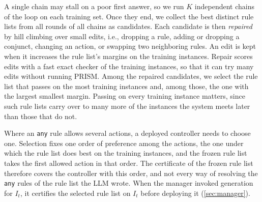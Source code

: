 A single chain may stall on a poor first answer, so we run $K$ independent chains of the loop on each training set.
Once they end, we collect the best distinct rule lists from all rounds of all chains as candidates.
Each candidate is then \textit{repaired} by hill climbing over small edits, i.e., dropping a rule, adding or dropping a conjunct, changing an action, or swapping two neighboring rules.
An edit is kept when it increases the rule list's margins on the training instances.
Repair scores edits with a fast exact checker of the training instances, so that it can try many edits without running PRISM.
Among the repaired candidates, we select the rule list that passes on the most training instances and, among those, the one with the largest smallest margin.
Passing on every training instance matters, since such rule lists carry over to many more of the instances the system meets later than those that do not.

Where an \texttt{any} rule allows several actions, a deployed controller needs to choose one.
Selection fixes one order of preference among the actions, the one under which the rule list does best on the training instances, and the frozen rule list takes the first allowed action in that order.
The certificate of the frozen rule list therefore covers the controller with this order, and not every way of resolving the \texttt{any} rules of the rule list the LLM wrote.
When the manager invoked generation for $I_t$, it certifies the selected rule list on $I_t$ before deploying it (\autoref{sec:manager}).
